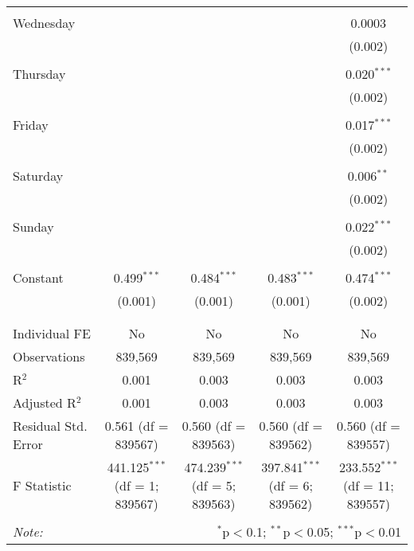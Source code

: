 \documentclass[
]{article}
\begin{document}
\begin{table}[!htbp]
{\begin{tabular}{@{\extracolsep{5pt}}lcccc}
  & & & & \\ 
 Wednesday &  &  &  & 0.0003 \\ 
  &  &  &  & (0.002) \\ 
  & & & & \\ 
 Thursday &  &  &  & 0.020$^{***}$ \\ 
  &  &  &  & (0.002) \\ 
  & & & & \\ 
 Friday &  &  &  & 0.017$^{***}$ \\ 
  &  &  &  & (0.002) \\ 
  & & & & \\ 
 Saturday &  &  &  & 0.006$^{**}$ \\ 
  &  &  &  & (0.002) \\ 
  & & & & \\ 
 Sunday &  &  &  & 0.022$^{***}$ \\ 
  &  &  &  & (0.002) \\ 
  & & & & \\ 
 Constant & 0.499$^{***}$ & 0.484$^{***}$ & 0.483$^{***}$ & 0.474$^{***}$ \\ 
  & (0.001) & (0.001) & (0.001) & (0.002) \\ 
  & & & & \\ 
\hline \\[-1.8ex] 
Individual FE & No & No & No & No \\ 
Observations & 839,569 & 839,569 & 839,569 & 839,569 \\ 
R$^{2}$ & 0.001 & 0.003 & 0.003 & 0.003 \\ 
Adjusted R$^{2}$ & 0.001 & 0.003 & 0.003 & 0.003 \\ 
Residual Std. Error & 0.561 (df = 839567) & 0.560 (df = 839563) & 0.560 (df = 839562) & 0.560 (df = 839557) \\ 
F Statistic & 441.125$^{***}$ (df = 1; 839567) & 474.239$^{***}$ (df = 5; 839563) & 397.841$^{***}$ (df = 6; 839562) & 233.552$^{***}$ (df = 11; 839557) \\ 
\hline 
\hline \\[-1.8ex] 
\textit{Note:}  & \multicolumn{4}{r}{$^{*}$p$<$0.1; $^{**}$p$<$0.05; $^{***}$p$<$0.01} \\ 
\end{tabular}
} 
\end{table} 
\newpage
\end{document}
